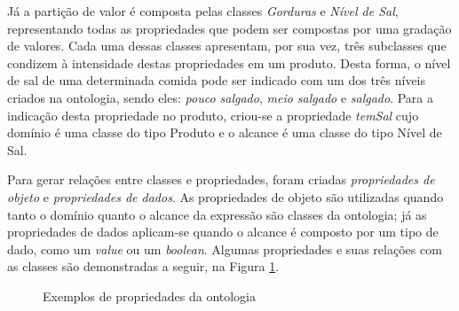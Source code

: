 Já a partição de valor é composta pelas classes \emph{Gorduras} e \emph{Nível de Sal}, representando todas as propriedades que podem ser compostas por uma gradação de valores. Cada uma dessas classes apresentam, por sua vez, três subclasses que condizem à intensidade destas propriedades em um produto. Desta forma, o nível de sal de uma determinada comida pode ser indicado com um dos três níveis criados na ontologia, sendo eles: \emph{pouco salgado}, \emph{meio salgado} e \emph{salgado}. Para a indicação desta propriedade no produto, criou-se a propriedade \emph{temSal} cujo domínio é uma classe do tipo Produto e o alcance é uma classe do tipo Nível de Sal. 

Para gerar relações entre classes e propriedades, foram criadas \emph{propriedades de objeto} e \emph{propriedades de dados}. As propriedades de objeto são utilizadas quando tanto o domínio quanto o alcance da expressão são classes da ontologia; já as propriedades de dados aplicam-se quando o alcance é composto por um tipo de dado, como um \emph{value} ou um \emph{boolean}. Algumas propriedades e suas relações com as classes são demonstradas a seguir, na Figura \ref{fig:propriedades}.
\begin{figure}
	\centering
	\caption[Propriedades da Ontologia]{Exemplos de propriedades da ontologia}
	\label{fig:propriedades}
	\qquad
\end{figure}

